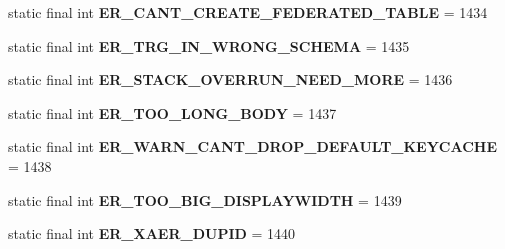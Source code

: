 \begin{DoxyCompactItemize}
static final int {\bfseries E\+R\+\_\+\+C\+A\+N\+T\+\_\+\+C\+R\+E\+A\+T\+E\+\_\+\+F\+E\+D\+E\+R\+A\+T\+E\+D\+\_\+\+T\+A\+B\+LE} = 1434
\item 
\mbox{\label{classcom_1_1mysql_1_1cj_1_1exceptions_1_1_mysql_error_numbers_a301857f6ecd9906b04426b1703d6576e}} 
static final int {\bfseries E\+R\+\_\+\+T\+R\+G\+\_\+\+I\+N\+\_\+\+W\+R\+O\+N\+G\+\_\+\+S\+C\+H\+E\+MA} = 1435
\item 
\mbox{\label{classcom_1_1mysql_1_1cj_1_1exceptions_1_1_mysql_error_numbers_a2405bf00c66510a5564ac0580b48b6bc}} 
static final int {\bfseries E\+R\+\_\+\+S\+T\+A\+C\+K\+\_\+\+O\+V\+E\+R\+R\+U\+N\+\_\+\+N\+E\+E\+D\+\_\+\+M\+O\+RE} = 1436
\item 
\mbox{\label{classcom_1_1mysql_1_1cj_1_1exceptions_1_1_mysql_error_numbers_a13f3ba9a0fd2ea502eae0a9b2327f5de}} 
static final int {\bfseries E\+R\+\_\+\+T\+O\+O\+\_\+\+L\+O\+N\+G\+\_\+\+B\+O\+DY} = 1437
\item 
\mbox{\label{classcom_1_1mysql_1_1cj_1_1exceptions_1_1_mysql_error_numbers_a02e4bd1d60cd1afb460aae2cefc5c2f1}} 
static final int {\bfseries E\+R\+\_\+\+W\+A\+R\+N\+\_\+\+C\+A\+N\+T\+\_\+\+D\+R\+O\+P\+\_\+\+D\+E\+F\+A\+U\+L\+T\+\_\+\+K\+E\+Y\+C\+A\+C\+HE} = 1438
\item 
\mbox{\label{classcom_1_1mysql_1_1cj_1_1exceptions_1_1_mysql_error_numbers_a6d6a0b3de53799fde0fa10f98b101034}} 
static final int {\bfseries E\+R\+\_\+\+T\+O\+O\+\_\+\+B\+I\+G\+\_\+\+D\+I\+S\+P\+L\+A\+Y\+W\+I\+D\+TH} = 1439
\item 
\mbox{\label{classcom_1_1mysql_1_1cj_1_1exceptions_1_1_mysql_error_numbers_a61a3b098ba5c2716a1ca863d530c3cf2}} 
static final int {\bfseries E\+R\+\_\+\+X\+A\+E\+R\+\_\+\+D\+U\+P\+ID} = 1440
\item 
\mbox{\label{classcom_1_1mysql_1_1cj_1_1exceptions_1_1_mysql_error_numbers_a2772cded8eff72106d930ac7bd75b988}} 

\end{DoxyCompactItemize}
